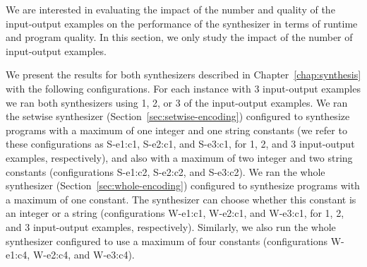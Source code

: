 We are interested in evaluating the impact of the number and quality of the
input-output examples on the performance of the synthesizer in terms of runtime
and program quality.
In this section, we only study the impact of the number of input-output
examples.

We present the results for both synthesizers described in
Chapter~\ref{chap:synthesis} with the following configurations.
For each instance with 3 input-output examples we ran both synthesizers using 1,
2, or 3 of the input-output examples.
We ran the setwise synthesizer (Section~\ref{sec:setwise-encoding}) configured
to synthesize programs with a maximum of one integer and one string constants
(we refer to these configurations as S-e1:c1, S-e2:c1, and S-e3:c1, for 1, 2,
and 3 input-output examples, respectively), and also with a maximum of two
integer and two string constants (configurations S-e1:c2, S-e2:c2, and S-e3:c2).
We ran the whole synthesizer (Section~\ref{sec:whole-encoding}) configured to
synthesize programs with a maximum of one constant. The synthesizer can
choose whether this constant is an integer or a string (configurations W-e1:c1,
W-e2:c1, and W-e3:c1, for 1, 2, and 3 input-output examples, respectively).
Similarly, we also run the whole synthesizer configured to use a maximum of four
constants (configurations W-e1:c4, W-e2:c4, and W-e3:c4).

